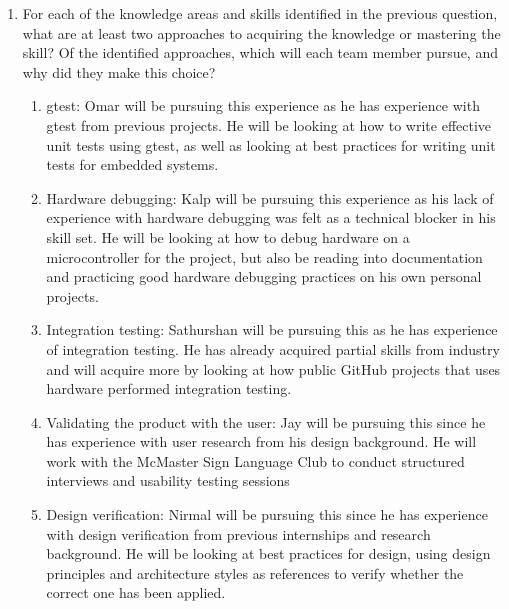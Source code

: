 \documentclass[12pt, titlepage]{article}
\begin{document}
\begin{enumerate}
  \item For each of the knowledge areas and skills identified in the previous
  question, what are at least two approaches to acquiring the knowledge or
  mastering the skill?  Of the identified approaches, which will each team
  member pursue, and why did they make this choice?

  \begin{enumerate}
    \item gtest: Omar will be pursuing this experience as he has experience with
    gtest from previous projects. He will be looking at how to write effective
    unit tests using gtest, as well as looking at best practices for writing
    unit tests for embedded systems. 
    \item Hardware debugging: Kalp will be pursuing this experience as his lack
    of experience with hardware debugging was felt as a technical blocker in his
    skill set. He will be looking at how to debug hardware on a microcontroller
    for the project, but also be reading into documentation and practicing good
    hardware debugging practices on his own personal projects. 
    \item Integration testing: Sathurshan will be pursuing this as he has
    experience of integration testing. He has already acquired partial skills
    from industry and will acquire more by looking at how public GitHub projects
    that uses hardware performed integration testing.
    \item Validating the product with the user: Jay will be pursuing this since
    he has experience with user research from his design background. He will
    work with the McMaster Sign Language Club to conduct structured interviews
    and usability testing sessions
    \item Design verification: Nirmal will be pursuing this since he has
    experience with design verification from previous internships and research
    background. He will be looking at best practices for design, using design
    principles and architecture styles as references to verify whether the
    correct one has been applied. 
  \end{enumerate}
\end{enumerate}
\end{document}
